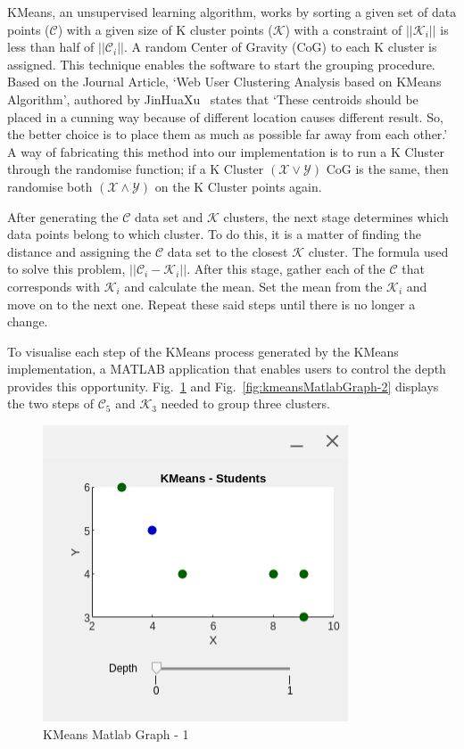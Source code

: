 \documentclass[conference]{IEEEtran}
\begin{document}
      KMeans, an unsupervised learning algorithm, works by sorting a given set of data points ($\mathcal{C}$) with a given size of K cluster points ($\mathcal{K}$) with a constraint of $\left||\mathcal{K}_{i}\right||$ is less than half of $\left||\mathcal{C}_{i}\right||$. A random Center of Gravity (CoG) to each K cluster is assigned. This technique enables the software to start the grouping procedure. Based on the Journal Article, `Web User Clustering Analysis based on KMeans Algorithm', authored by JinHuaXu~\cite{jinhuaxu_web_2010} states that `These centroids should be placed in a cunning way because of different location causes different result. So, the better choice is to place them as much as possible far away from each other.' A way of fabricating this method into our implementation is to run a K Cluster through the randomise function; if a K Cluster $(\mathcal{X} \vee \mathcal{Y})$ CoG is the same, then randomise both $(\mathcal{X} \wedge \mathcal{Y})$ on the K Cluster points again.

      After generating the $\mathcal{C}$ data set and $\mathcal{K}$ clusters, the next stage determines which data points belong to which cluster. To do this, it is a matter of finding the distance and assigning the $\mathcal{C}$ data set to the closest $\mathcal{K}$ cluster. The formula used to solve this problem, $\left||\mathcal{C}_{i} - \mathcal{K}_{i}\right||$. After this stage, gather each of the $\mathcal{C}$ that corresponds with $\mathcal{K}_{i}$ and calculate the mean. Set the mean from the $\mathcal{K}_{i}$ and move on to the next one. Repeat these said steps until there is no longer a change.

      To visualise each step of the KMeans process generated by the KMeans implementation, a MATLAB application that enables users to control the depth provides this opportunity. Fig.~\ref{fig:kmeansMatlabGraph-1} and Fig.~\ref{fig:kmeansMatlabGraph-2} displays the two steps of $\mathcal{C}_{5}$ and $\mathcal{K}_{3}$ needed to group three clusters.
      \begin{figure}[ht]
        \centering
        \includegraphics[width=0.65\columnwidth]{Figures/fig4.png}
        \caption{KMeans Matlab Graph - 1}
        \label{fig:kmeansMatlabGraph-1}
      \end{figure}
\end{document}
